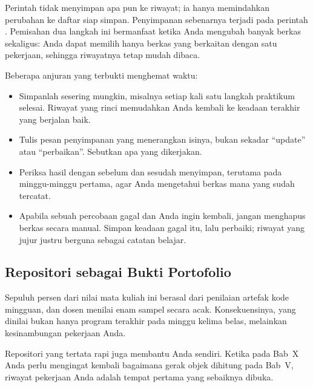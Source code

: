 Perintah  tidak menyimpan apa pun ke riwayat; ia hanya
memindahkan perubahan ke daftar siap simpan. Penyimpanan sebenarnya terjadi
pada perintah . Pemisahan dua langkah ini bermanfaat ketika
Anda mengubah banyak berkas sekaligus: Anda dapat memilih hanya berkas yang
berkaitan dengan satu pekerjaan, sehingga riwayatnya tetap mudah dibaca.

\begin{tipsbox}
Beberapa anjuran yang terbukti menghemat waktu:
\begin{itemize}
  \item Simpanlah sesering mungkin, misalnya setiap kali satu langkah
        praktikum selesai. Riwayat yang rinci memudahkan Anda kembali ke
        keadaan terakhir yang berjalan baik.
  \item Tulis pesan penyimpanan yang menerangkan isinya, bukan sekadar
        ``update'' atau ``perbaikan''. Sebutkan apa yang dikerjakan.
  \item Periksa hasil dengan  sebelum dan sesudah menyimpan,
        terutama pada minggu-minggu pertama, agar Anda mengetahui berkas mana
        yang sudah tercatat.
  \item Apabila sebuah percobaan gagal dan Anda ingin kembali, jangan menghapus
        berkas secara manual. Simpan keadaan gagal itu, lalu perbaiki; riwayat
        yang jujur justru berguna sebagai catatan belajar.
\end{itemize}
\end{tipsbox}

\subsection{Repositori sebagai Bukti Portofolio}

Sepuluh persen dari nilai mata kuliah ini berasal dari penilaian artefak kode
mingguan, dan dosen menilai enam sampel secara acak. Konsekuensinya, yang
dinilai bukan hanya program terakhir pada minggu kelima belas, melainkan
kesinambungan pekerjaan Anda.

Repositori yang tertata rapi juga membantu Anda sendiri. Ketika pada Bab~X
Anda perlu mengingat kembali bagaimana gerak objek dihitung pada Bab~V,
riwayat pekerjaan Anda adalah tempat pertama yang sebaiknya dibuka.
